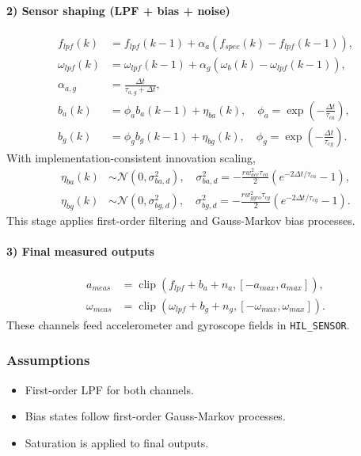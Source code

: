 \documentclass[11pt,a4paper]{article}
\begin{document}
\paragraph{2) Sensor shaping (LPF + bias + noise)}
\begin{align}
f_{lpf}(k) &= f_{lpf}(k-1)+\alpha_a\left(f_{spec}(k)-f_{lpf}(k-1)\right), \\
\omega_{lpf}(k) &= \omega_{lpf}(k-1)+\alpha_g\left(\omega_b(k)-\omega_{lpf}(k-1)\right), \\
\alpha_{a,g} &= \frac{\Delta t}{\tau_{a,g}+\Delta t}, \\
b_a(k) &= \phi_a b_a(k-1)+\eta_{ba}(k), \quad \phi_a=\exp\left(-\frac{\Delta t}{\tau_{ca}}\right), \\
b_g(k) &= \phi_g b_g(k-1)+\eta_{bg}(k), \quad \phi_g=\exp\left(-\frac{\Delta t}{\tau_{cg}}\right).
\end{align}
With implementation-consistent innovation scaling,
\begin{align}
\eta_{ba}(k) &\sim \mathcal{N}(0,\sigma_{ba,d}^2), \quad
\sigma_{ba,d}^2=-\frac{rw_{acc}^2\tau_{ca}}{2}\left(e^{-2\Delta t/\tau_{ca}}-1\right), \\
\eta_{bg}(k) &\sim \mathcal{N}(0,\sigma_{bg,d}^2), \quad
\sigma_{bg,d}^2=-\frac{rw_{gyro}^2\tau_{cg}}{2}\left(e^{-2\Delta t/\tau_{cg}}-1\right).
\end{align}
This stage applies first-order filtering and Gauss-Markov bias processes.

\paragraph{3) Final measured outputs}
\begin{align}
a_{meas} &= \operatorname{clip}(f_{lpf}+b_a+n_a,[-a_{max},a_{max}]), \\
\omega_{meas} &= \operatorname{clip}(\omega_{lpf}+b_g+n_g,[-\omega_{max},\omega_{max}]).
\end{align}
These channels feed accelerometer and gyroscope fields in \texttt{HIL\_SENSOR}.

\subsubsection*{Assumptions}
\begin{itemize}
    \item First-order LPF for both channels.
    \item Bias states follow first-order Gauss-Markov processes.
    \item Saturation is applied to final outputs.
\end{itemize}
\end{document}
